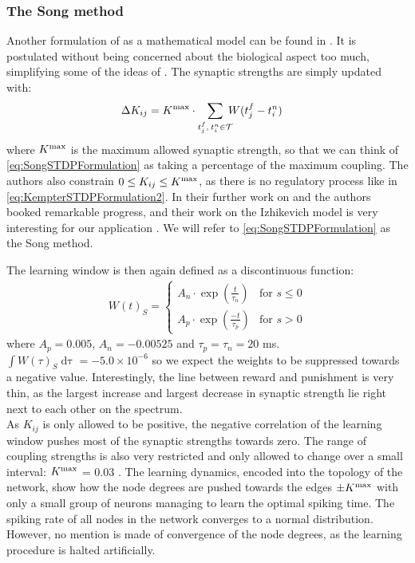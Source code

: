 \subsubsection{The Song method}
Another formulation of \STDP as a mathematical model can be found in \cite{Song2000}. It is postulated without being concerned about the biological aspect too much, simplifying some of the ideas of \cite{Kempter1999}. The synaptic strengths are simply updated with:
\begin{align}
\Delta K_{ij} &= K^{\rm max} \cdot \sum_{t_{j}^{f}, \: t_i^{n} \in \mathcal{T}} \hspace{-2mm} W (t_{j}^{f}-t_i^{n} ) \label{eq:SongSTDPFormulation}
\end{align}
where $K^{\rm max}$ is the maximum allowed synaptic strength, so that we can think of \eqref{eq:SongSTDPFormulation} as taking a percentage of the maximum coupling. The authors also constrain $0 \leq K_{ij} \leq K^{\rm max}$, as there is no regulatory process like in \eqref{eq:KempterSTDPFormulation2}. In their further work on \STDP and \IP the authors booked remarkable progress, and their work on the Izhikevich model is very interesting for our application \cite{Song2017}. We will refer to \eqref{eq:SongSTDPFormulation} as the Song method. 

The learning window is then again defined as a discontinuous function:
\begin{align}
W(t)_S =
\begin{cases}
A_{n} \cdot \exp \left(\frac{t}{\tau_n}\right)  & \text{for } s \leq 0 \\
A_{p} \cdot \exp \left(\frac{-t}{\tau_p}\right) & \text{for } s > 0 
\end{cases} \label{eq:learningwindowSong2000}
\end{align}
where $A_p = 0.005$, $A_n = -0.00525$ and $\tau_p = \tau_n = 20$ ms. $\int W(\tau)_S \mathop{d \tau} = -5.0 \times 10^{-6}$ so we expect the weights to be suppressed towards a negative value. Interestingly, the line between reward and punishment is very thin, as the largest increase and largest decrease in synaptic strength lie right next to each other on the spectrum. \\

As $K_{ij}$ is only allowed to be positive, the negative correlation of the learning window pushes most of the synaptic strengths towards zero. The range of coupling strengths is also very restricted and only allowed to change over a small interval: $K^{\rm max}$ = 0.03 \cite{Song2000, Song2017, ChrolCannon2012}. The learning dynamics, encoded into the topology of the network, show how the node degrees are pushed towards the edges $\pm K^{\rm max}$ with only a small group of neurons managing to learn the optimal spiking time. The spiking rate of all nodes in the network converges to a normal distribution. However, no mention is made of convergence of the node degrees, as the learning procedure is halted artificially.\\

